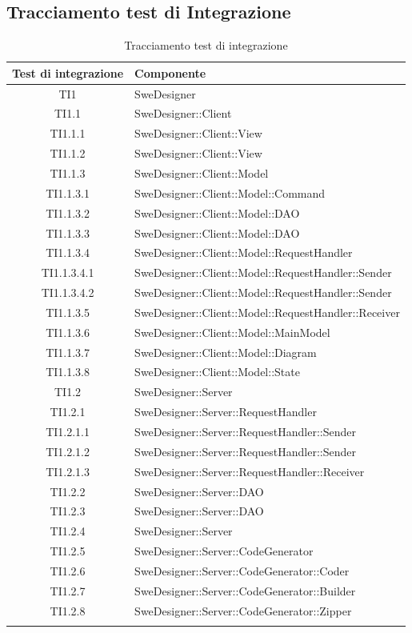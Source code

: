 \documentclass[../PianoDiQualifica.tex]{subfiles}
\begin{document}
	\subsection{Tracciamento test di Integrazione}
	\normalsize
	\begin{longtable}{|c|l|}
		\hline
		\textbf{Test di integrazione} & \textbf{Componente}\\
		\hline
		\endhead
		TI1 & SweDesigner \\
		\hline
		TI1.1 & SweDesigner::Client \\
		\hline
		TI1.1.1 & SweDesigner::Client::View \\
		\hline
		TI1.1.2 & SweDesigner::Client::View \\
		\hline
		TI1.1.3 & SweDesigner::Client::Model \\
		\hline
		TI1.1.3.1 & SweDesigner::Client::Model::Command \\
		\hline
		TI1.1.3.2 & SweDesigner::Client::Model::DAO \\
		\hline
		TI1.1.3.3 & SweDesigner::Client::Model::DAO \\
		\hline
		TI1.1.3.4 & SweDesigner::Client::Model::RequestHandler \\
		\hline
		TI1.1.3.4.1 & SweDesigner::Client::Model::RequestHandler::Sender \\
		\hline
		TI1.1.3.4.2 & SweDesigner::Client::Model::RequestHandler::Sender \\
		\hline
		TI1.1.3.5 & SweDesigner::Client::Model::RequestHandler::Receiver \\
		\hline
		TI1.1.3.6 & SweDesigner::Client::Model::MainModel \\
		\hline
		TI1.1.3.7 & SweDesigner::Client::Model::Diagram \\
		\hline
		TI1.1.3.8 & SweDesigner::Client::Model::State \\
		\hline
		TI1.2 & SweDesigner::Server \\
		\hline
		TI1.2.1 & SweDesigner::Server::RequestHandler \\
		\hline
		TI1.2.1.1 & SweDesigner::Server::RequestHandler::Sender \\
		\hline
		TI1.2.1.2 & SweDesigner::Server::RequestHandler::Sender \\
		\hline
		TI1.2.1.3 & SweDesigner::Server::RequestHandler::Receiver \\
		\hline
		TI1.2.2 & SweDesigner::Server::DAO \\
		\hline
		TI1.2.3 & SweDesigner::Server::DAO \\
		\hline
		TI1.2.4 & SweDesigner::Server \\
		\hline
		TI1.2.5 & SweDesigner::Server::CodeGenerator \\
		\hline
		TI1.2.6 & SweDesigner::Server::CodeGenerator::Coder \\
		\hline
		TI1.2.7 & SweDesigner::Server::CodeGenerator::Builder \\
		\hline
		TI1.2.8 & SweDesigner::Server::CodeGenerator::Zipper \\
		\hline
		\caption[Tracciamento test di integrazione]{Tracciamento test di integrazione}
		\label{tabella:TracciamentoTestIntegrazione}
	\end{longtable}
\end{document}
